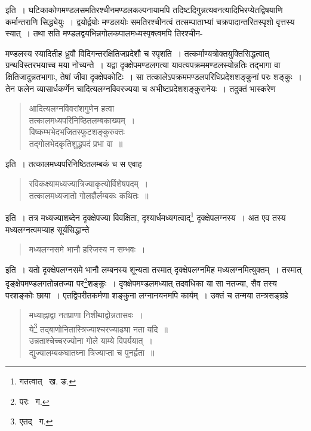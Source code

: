 \documentclass[11pt, openany]{book}
\begin{document}
\noindent इति~। घटिकाकोणमण्डलसमतिरश्चीनमण्डलकल्पनायामपि तदिष्टदिगुन्नत्यवनत्यादिभिरप्येतद्विषयाणि कर्मान्तराणि सिद्ध्येयुः~।
द्वयोर्द्वयोः मण्डलयोः समतिरश्चीनत्वं तत्सम्पाताभ्यां चक्रपादान्तरितस्पृशो वृत्तस्य स्यात्~। तथा सति मण्डलद्वयभिन्नगोलकपालमध्यस्पृक्त्वमपि तिरश्चीन- 

\newpage

\noindent मण्डलस्य स्यादितीह ध्रुवौ विदिगन्तरक्षितिजप्रदेशौ च स्पृशति~। तत्कर्माण्यत्रोक्तयुक्तिसिद्धत्वात् ग्रन्थविस्तरभयाच्च मया नोच्यन्ते~।
यद्वा दृक्क्षेपमण्डलगत्या यावत्यपक्रममण्डलस्योन्नतिः तद्भागा वा क्षितिजादुन्नतभागाः, तेषां जीवा दृक्क्षेपकोटिः~। सा तत्कालेऽपक्रममण्डलपरिधिप्रदेशशङ्कुनां परः शङ्कुः~। तेन फलेन व्यासार्धकर्णेन चादित्यलग्नविवरज्यया च अभीष्टप्रदेशशङ्कुरानेयः~। तदुक्तं भास्करेण\textendash 

\begin{quote}
{\qt आदित्यलग्नविवरांशगुणेन हत्वा \\
तत्कालमध्यपरिनिष्ठितलम्बकाख्यम्~। \\
विष्कम्भभेदभजितस्फुटशङ्कुरुक्तः \\
तद्गोलभेदकृतिशुद्धपदं प्रभा वा~॥}
\end{quote}

\noindent इति~। तत्कालमध्यपरिनिष्ठितलम्बकं च स एवाह\textendash  
\begin{quote}
{\qt रविकक्ष्यामध्यज्यात्रिज्याकृत्योर्विशेषपदम्~। \\
तत्कालमध्यजातो गोलज्ञैर्लम्बकः कथितः~॥} 
\end{quote}
 
\noindent इति~। तत्र मध्यज्याशब्देन दृक्क्षेपज्या विवक्षिता, दृश्यार्धमध्यगत्वाद्\renewcommand{\thefootnote}{१}\footnote{गतत्वात् \textendash\ ख. ङ.} दृक्क्षेपलग्नस्य~। अत एव तस्य मध्यलग्नत्वमप्याह सूर्यसिद्धान्ते\textendash 

\begin{quote}
{\qt मध्यलग्नसमे भानौ हरिजस्य न सम्भवः~।} 
\end{quote}

\noindent इति~। यतो दृक्क्षेपलग्नसमे भानौ लम्बनस्य शून्यता तस्मात् दृक्क्षेपलग्नमिह मध्यलग्नमित्युक्तम्~। तस्मात् दृङ्क्षेपमण्डलगतोन्नतज्या
पर\renewcommand{\thefootnote}{२}\footnote{परः \textendash\ ग.}शङ्कुः~। दृक्क्षेपमण्डलमध्यात् तदवधिका या सा नतज्या, सैव तस्य परशङ्कोः छाया~। एतद्विपरीतकर्मणा शङ्कुना लग्नानयनमपि कार्यम्~। उक्तं च तन्मया तन्त्रसङ्ग्रहे\textendash  

\begin{quote}
{\qt मध्याह्नाद्वा नतप्राणा निशीथाद्वोन्नतासवः~। \\
 ये\renewcommand{\thefootnote}{३}\footnote{एतद् \textendash\ ग.} तद्बाणोनितास्त्रिज्याश्चरज्याढ्या नता यदि~॥ \\
उन्नताश्चेच्चरज्योना गोले याम्ये विपर्ययात्~। \\
द्युज्यालम्बकघातघ्ना त्रिज्याप्ता च पुनर्हृता~॥} 
\end{quote}
\end{document}
